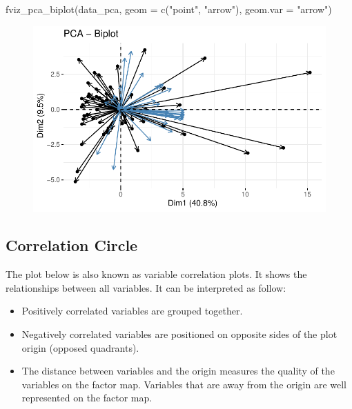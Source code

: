 \documentclass[
  letterpaper,
  DIV=11,
  numbers=noendperiod]{scrreprt}
\newenvironment{Shaded}{\begin{snugshade}}{\end{snugshade}}
\newcommand{\AttributeTok}[1]{\textcolor[rgb]{0.40,0.45,0.13}{#1}}
\newcommand{\FunctionTok}[1]{\textcolor[rgb]{0.28,0.35,0.67}{#1}}
\newcommand{\NormalTok}[1]{\textcolor[rgb]{0.00,0.23,0.31}{#1}}
\newcommand{\StringTok}[1]{\textcolor[rgb]{0.13,0.47,0.30}{#1}}
\begin{document}
\begin{Shaded}
\begin{Highlighting}[]
\FunctionTok{fviz\_pca\_biplot}\NormalTok{(data\_pca, }
                \AttributeTok{geom =} \FunctionTok{c}\NormalTok{(}\StringTok{"point"}\NormalTok{, }\StringTok{"arrow"}\NormalTok{),}
                \AttributeTok{geom.var =} \StringTok{"arrow"}\NormalTok{)}
\end{Highlighting}
\end{Shaded}

\begin{figure}[H]

{\centering \includegraphics{analysis_files/figure-pdf/unnamed-chunk-22-1.pdf}

}

\end{figure}

\hypertarget{correlation-circle}{%
\subsection{Correlation Circle}\label{correlation-circle}}

The plot below is also known as variable correlation plots. It shows the
relationships between all variables. It can be interpreted as follow:

\begin{itemize}
\item
  Positively correlated variables are grouped together.
\item
  Negatively correlated variables are positioned on opposite sides of
  the plot origin (opposed quadrants).
\item
  The distance between variables and the origin measures the quality of
  the variables on the factor map. Variables that are away from the
  origin are well represented on the factor map.
\end{itemize}
\end{document}
